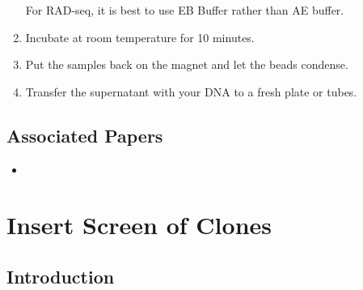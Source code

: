 \documentclass[
  letterpaper,
  DIV=11,
  numbers=noendperiod]{scrreprt}
\providecommand{\tightlist}{%
  \setlength{\itemsep}{0pt}\setlength{\parskip}{0pt}}\usepackage{longtable,booktabs,array}
\begin{document}
\begin{enumerate}
  \begin{tcolorbox}[enhanced jigsaw, rightrule=.15mm, title=\textcolor{quarto-callout-warning-color}{\faExclamationTriangle}\hspace{0.5em}{NOTE}, titlerule=0mm, opacitybacktitle=0.6, toprule=.15mm, bottomrule=.15mm, opacityback=0, left=2mm, colframe=quarto-callout-warning-color-frame, breakable, coltitle=black, colback=white, colbacktitle=quarto-callout-warning-color!10!white, bottomtitle=1mm, leftrule=.75mm, toptitle=1mm, arc=.35mm]

  For RAD-seq, it is best to use EB Buffer rather than AE buffer.

  \end{tcolorbox}
\item
  Incubate at room temperature for 10 minutes.
\item
  Put the samples back on the magnet and let the beads condense.
\item
  Transfer the supernatant with your DNA to a fresh plate or tubes.
\end{enumerate}

\hypertarget{associated-papers-13}{%
\section{Associated Papers}\label{associated-papers-13}}

\begin{itemize}
\tightlist
\item
\end{itemize}

\hypertarget{sec-molecular-clone_insert_screen}{%
\chapter{Insert Screen of
Clones}\label{sec-molecular-clone_insert_screen}}

\hypertarget{introduction-21}{%
\section{Introduction}\label{introduction-21}}
\end{document}
